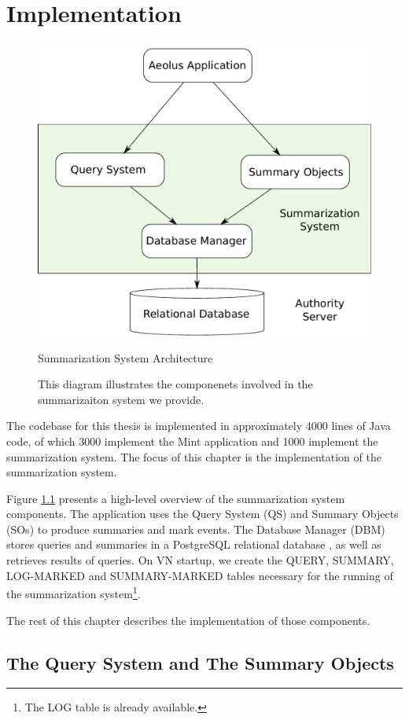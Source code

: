 \chapter{Implementation}

\begin{figure}[h]
\centering
\includegraphics[width=.8\textwidth,keepaspectratio]{figures/impl-sysarch}
\caption*{Summarization System Architecture}
\caption[Summarization System Architecture]{This diagram illustrates the componenets involved in the summarizaiton system we provide.}
\label{fig:impl-sysarch}
\end{figure}

The codebase for this thesis is implemented in approximately 4000 lines of Java code, of which 3000 implement the Mint application and 1000 implement the summarization system. The focus of this chapter is the implementation of the summarization system.

Figure \ref{fig:impl-sysarch} presents a high-level overview of the summarization system components. The application uses the Query System (QS) and Summary Objects (SOs) to produce summaries and mark events. The Database Manager (DBM) stores queries and summaries in a PostgreSQL relational database \cite{pgsql-gen}, as well as retrieves results of queries. On VN startup, we create the QUERY, SUMMARY, LOG-MARKED and SUMMARY-MARKED tables necessary for the running of the summarization system\footnote{The LOG table is already available.}.

The rest of this chapter describes the implementation of those components.

\section{The Query System and The Summary Objects}

